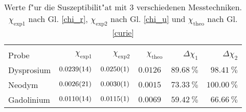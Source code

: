 
\begin{table}[!h]
\begin{center}
\begin{tabular}{|l|r|r|r|r|r|}
\hline
 &&&&&\\
 Probe & $\chi_\mathrm{exp1}$ & $\chi_\mathrm{exp2}$ & $\chi_\mathrm{theo}$ & $\Delta \chi_\mathrm{1}$ & $\Delta \chi_\mathrm{2}$ \\
\hline
\hline

Dysprosium & $\SI{0.0239 (14)}{}$ & $\SI{0.0250 (1)}{}$ & $\SI{0.0126}{}$ & $\SI{89.68}{\%}$ & $\SI{98.41}{\%}$\\
Neodym     & $\SI{0.0026 (21)}{}$ & $\SI{0.0030 (1)}{}$ & $\SI{0.0015}{}$ & $\SI{73.33}{\%}$ & $\SI{100.00}{\%}$ \\
Gadolinium & $\SI{0.0110 (14)}{}$ & $\SI{0.0115 (1)}{}$ & $\SI{0.0069}{}$ & $\SI{59.42}{\%}$ & $\SI{66.66}{\%}$\\

\hline
\end{tabular}
\caption{Werte f"ur die Suszeptibilit"at mit 3 verschiedenen Messtechniken. $\chi_\mathrm{exp1}$ nach Gl. \eqref{chi_r}, $\chi_\mathrm{exp2}$ nach Gl. \eqref{chi_u} und $\chi_\mathrm{theo}$ nach Gl. \eqref{curie}}
\label{suszep}
\end{center}
\end{table}